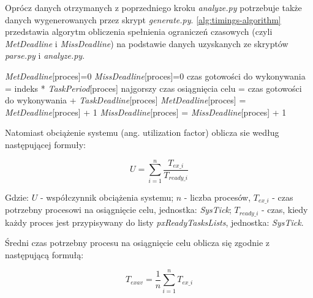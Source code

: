 \documentclass[../../main]{subfiles}
\begin{document}
Oprócz danych otrzymanych z poprzedniego kroku \textit{analyze.py} potrzebuje także danych wygenerowanych przez skrypt \textit{generate.py}. \cref{alg:timings-algorithm} przedstawia algorytm obliczenia spełnienia ograniczeń czasowych (czyli \textit{MetDeadline} i \textit{MissDeadline}) na podstawie danych uzyskanych ze skryptów \textit{parse.py} i \textit{analyze.py}.

\begin{algorithm}
\caption{Algorytm liczący spełnienie ograniczeń czasowych dla każdego z procesów}\label{alg:timings-algorithm}
\begin{algorithmic}[1]
  \State \textit{MetDeadline}[proces]=0
  \State \textit{MissDeadline}[proces]=0
    \State czas gotowości do wykonywania = indeks * \textit{TaskPeriod}[proces]
    \State najgorszy czas osiągnięcia celu = czas gotowości do wykonywania + \textit{TaskDeadline}[proces]
      \State \textit{MetDeadline}[proces] = \textit{MetDeadline}[proces] + 1
      \State \textit{MissDeadline}[proces] = \textit{MissDeadline}[proces] + 1
    \EndIf
  \EndFor
\EndFor
\end{algorithmic}
\end{algorithm}

Natomiast obciążenie systemu (ang. utilization factor) oblicza sie według następującej formuły:

\large
\begin{equation}
    U = \sum_{i=1}^{n} \frac{T_{ex\_i}}{T_{ready\_i}}
    \label{eq:utilization}
\end{equation}
\normalsize

Gdzie: $U$ - współczynnik obciążenia systemu; $n$ - liczba procesów, $T_{ex\_i}$ - czas potrzebny  procesowi na osiągnięcie celu, jednostka: \textit{SysTick}; $T_{ready\_i}$ - czas,
kiedy każdy proces jest przypisywany do listy \textit{pxReadyTasksLists}, jednostka: \textit{SysTick}.

Średni czas potrzebny procesu na osiągnięcie celu oblicza się zgodnie z następującą formułą:

\large
\begin{equation}
    T_{exav}= \frac{1}{n}\sum_{i=1}^nT_{ex\_i}
    \label{eq:avarage-ex-time}
\end{equation}
\normalsize
\end{document}
